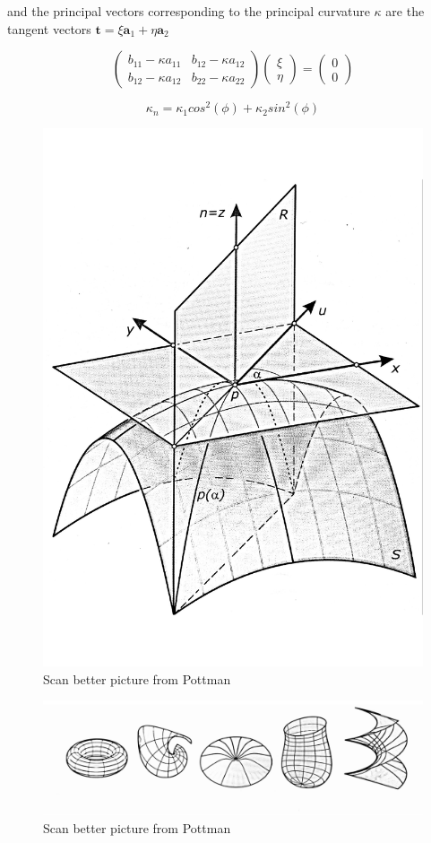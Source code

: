 and the principal vectors corresponding to the principal curvature $\kappa$ are the tangent vectors $\textbf{t} = \xi \textbf{a}_1 + \eta \textbf{a}_2$

\begin{equation}
\begin{pmatrix} 
b_{11} - \kappa a_{11} & b_{12} - \kappa a_{12} \\ 
b_{12} - \kappa a_{12} & b_{22} - \kappa a_{22}
\end{pmatrix}
\begin{pmatrix}
\xi \\
\eta
\end{pmatrix}
=
\begin{pmatrix}
0 \\
0
\end{pmatrix}
\end{equation}


\begin{equation}
\kappa_n = \kappa_1cos^2(\phi) + \kappa_2sin^2(\phi) 
\end{equation}

\begin{figure}[H]
\centering
\includegraphics[width = 0.6\linewidth ]{figure/Theory/principalCurvature2.pdf}
\caption{Scan better picture from Pottman\cite{ref:ArchGeometry} }
\end{figure}



\begin{figure}[H]
\centering
\includegraphics[width = 0.9\linewidth ]{figure/Theory/principalCurvature.pdf}
\caption{Scan better picture from Pottman \cite{ref:ArchGeometry}}
\end{figure}


